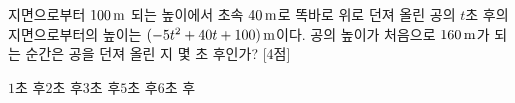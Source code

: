 지면으로부터 $100\mkern3mu \mathrm{m}$ 되는 높이에서 초속 $40\mkern3mu \mathrm{m}$로 똑바로 위로 던져 올린 공의 $t$초 후의 지면으로부터의 높이는 $(-5t^2+40t+100)\mkern3mu \mathrm{m}$이다. 공의 높이가 처음으로 $160\mkern3mu \mathrm{m}$가 되는 순간은 공을 던져 올린 지 몇 초 후인가? \mbox{[4점]}
\begin{choices32}{$1$초 후}{$2$초 후}{$3$초 후}{$5$초 후}{$6$초 후}\end{choices32}
